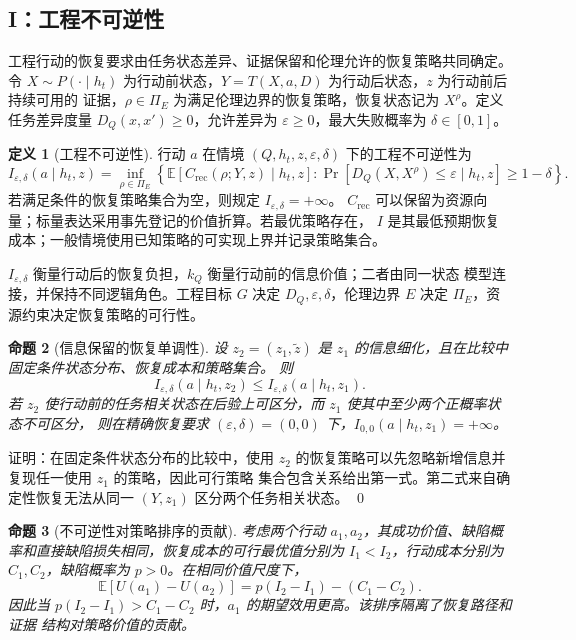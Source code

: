 \documentclass[11pt,a4paper]{ctexart}
\numberwithin{equation}{section}
\theoremstyle{definition}
\newtheorem{definition}{定义}[section]
\theoremstyle{plain}
\newtheorem{proposition}[definition]{命题}
\begin{document}
\subsection{I：工程不可逆性}

工程行动的恢复要求由任务状态差异、证据保留和伦理允许的恢复策略共同确定。令
$X\sim P(\cdot\mid h_t)$ 为行动前状态，$Y=T(X,a,D)$ 为行动后状态，$z$ 为行动前后持续可用的
证据，$\rho\in\Pi_E$ 为满足伦理边界的恢复策略，恢复状态记为 $X^\rho$。定义任务差异度量
$D_Q(x,x')\ge0$，允许差异为 $\varepsilon\ge0$，最大失败概率为 $\delta\in[0,1]$。

\begin{definition}[工程不可逆性]
行动 $a$ 在情境 $(Q,h_t,z,\varepsilon,\delta)$ 下的工程不可逆性为
\begin{equation}
I_{\varepsilon,\delta}(a\mid h_t,z)
=
\inf_{\rho\in\Pi_E}
\left\{
\mathbb E\!\left[C_{\mathrm{rec}}(\rho;Y,z)\mid h_t,z\right]:
\Pr\!\left[D_Q(X,X^\rho)\le\varepsilon\mid h_t,z\right]\ge1-\delta
\right\}.
\label{eq:irreversibility}
\end{equation}
若满足条件的恢复策略集合为空，则规定 $I_{\varepsilon,\delta}=+\infty$。
$C_{\mathrm{rec}}$ 可以保留为资源向量；标量表达采用事先登记的价值折算。若最优策略存在，
$I$ 是其最低预期恢复成本；一般情境使用已知策略的可实现上界并记录策略集合。
\end{definition}

$I_{\varepsilon,\delta}$ 衡量行动后的恢复负担，$k_Q$ 衡量行动前的信息价值；二者由同一状态
模型连接，并保持不同逻辑角色。工程目标 $G$ 决定 $D_Q,\varepsilon,\delta$，伦理边界 $E$ 决定
$\Pi_E$，资源约束决定恢复策略的可行性。

\begin{proposition}[信息保留的恢复单调性]
设 $z_2=(z_1,\widetilde z)$ 是 $z_1$ 的信息细化，且在比较中固定条件状态分布、恢复成本和策略集合。
则
\[
I_{\varepsilon,\delta}(a\mid h_t,z_2)
\le
I_{\varepsilon,\delta}(a\mid h_t,z_1).
\]
若 $z_2$ 使行动前的任务相关状态在后验上可区分，而 $z_1$ 使其中至少两个正概率状态不可区分，
则在精确恢复要求 $(\varepsilon,\delta)=(0,0)$ 下，$I_{0,0}(a\mid h_t,z_1)=+\infty$。
\end{proposition}

证明：在固定条件状态分布的比较中，使用 $z_2$ 的恢复策略可以先忽略新增信息并复现任一使用 $z_1$ 的策略，因此可行策略
集合包含关系给出第一式。第二式来自确定性恢复无法从同一 $(Y,z_1)$ 区分两个任务相关状态。
\qed

\begin{proposition}[不可逆性对策略排序的贡献]
考虑两个行动 $a_1,a_2$，其成功价值、缺陷概率和直接缺陷损失相同，恢复成本的可行最优值分别为
$I_1<I_2$，行动成本分别为 $C_1,C_2$，缺陷概率为 $p>0$。在相同价值尺度下，
\[
\mathbb E[U(a_1)-U(a_2)]
=
p(I_2-I_1)-(C_1-C_2).
\]
因此当 $p(I_2-I_1)>C_1-C_2$ 时，$a_1$ 的期望效用更高。该排序隔离了恢复路径和证据
结构对策略价值的贡献。
\end{proposition}
\end{document}
